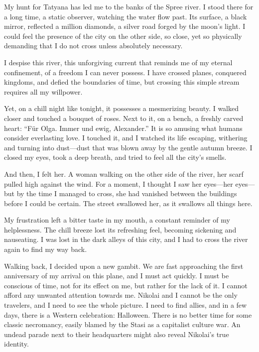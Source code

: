 
My hunt for Tatyana has led me to the banks of the Spree river.
I stood there for a long time, a static observer, watching the water flow past.
Its surface, a black mirror, reflected a million diamonds, a silver road forged by the moon's light.
I could feel the presence of the city on the other side, so close, yet so physically demanding that I do not cross unless absolutely necessary.

I despise this river, this unforgiving current that reminds me of my eternal confinement, of a freedom I can never possess.
I have crossed planes, conquered kingdoms, and defied the boundaries of time, but crossing this simple stream requires all my willpower.

Yet, on a chill night like tonight, it possesses a mesmerizing beauty.
I walked closer and touched a bouquet of roses.
Next to it, on a bench, a freshly carved heart: ``Für Olga. Immer und ewig, Alexander.''
It is so amusing what humans consider everlasting love.
I touched it, and I watched its life escaping, withering and turning into dust—dust that was blown away by the gentle autumn breeze.
I closed my eyes, took a deep breath, and tried to feel all the city's smells.

And then, I felt her.
A woman walking on the other side of the river, her scarf pulled high against the wind.
For a moment, I thought I saw her eyes—her eyes—but by the time I managed to cross, she had vanished between the buildings before I could be certain.
The street swallowed her, as it swallows all things here.

My frustration left a bitter taste in my mouth, a constant reminder of my helplessness.
The chill breeze lost its refreshing feel, becoming sickening and nauseating.
I was lost in the dark alleys of this city, and I had to cross the river again to find my way back.

Walking back, I decided upon a new gambit.
We are fast approaching the first anniversary of my arrival on this plane, and I must act quickly.
I must be conscious of time, not for its effect on me, but rather for the lack of it.
I cannot afford any unwanted attention towards me.
Nikolai and I cannot be the only travelers, and I need to see the whole picture.
I need to find allies, and in a few days, there is a Western celebration: Halloween.
There is no better time for some classic necromancy, easily blamed by the Stasi as a capitalist culture war.
An undead parade next to their headquarters might also reveal Nikolai's true identity.

\vfill\newpage
